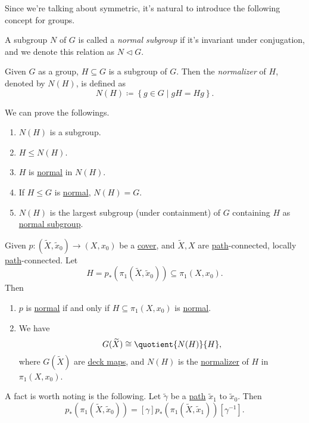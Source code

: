 Since we're talking about symmetric, it's natural to introduce the following concept for groups.
\begin{definition}\label{def:normal-subgroup}
	A subgroup \(N\) of \(G\) is called a \emph{normal subgroup} if it's invariant under conjugation, and we denote this relation as \(N \triangleleft G\).
\end{definition}

\begin{definition}[Normalizer]\label{def:normalizer}
	Given \(G\) as a group, \(H\subseteq G\) is a subgroup of \(G\). Then the \emph{normalizer} of \(H\), denoted by \(N(H)\), is defined as
	\[
		N(H) \coloneqq \left\{g\in G \mid gH = H g\right\}.
	\]
\end{definition}

\begin{exercise}
	We can prove the followings.
	\begin{enumerate}
		\item \(N(H)\) is a subgroup.
		\item \(H\leq N(H)\).
		\item \(H\) is \hyperref[def:normal-subgroup]{normal} in \(N(H)\).
		\item If \(H\leq G\) is \hyperref[def:normal-subgroup]{normal}, \(N(H) = G\).
		\item \(N(H)\) is the largest subgroup (under containment) of \(G\) containing \(H\) as \hyperref[def:normal-subgroup]{normal subgroup}.
	\end{enumerate}
\end{exercise}

\begin{proposition}\label{prop:lec17}
	Given \(p\colon (\widetilde{X} , \widetilde{x} _0)\to (X, x_0)\) be a \hyperref[def:covering-map]{cover}, and \(\widetilde{X} , X\)
	are \hyperref[def:path]{path}-connected, locally \hyperref[def:path]{path}-connected. Let
	\[
		H = p_\ast (\pi _1(\widetilde{X} , \widetilde{x} _0))\subseteq \pi _1(X, x_0).
	\]
	Then
	\begin{enumerate}
		\item \(p\) is \hyperref[def:normal-cover]{normal} if and only if \(H\subseteq \pi _1(X, x_0)\) is \hyperref[def:normal-subgroup]{normal}.
		\item We have
		      \[
			      G(\widetilde{X} )\cong \quotient{N(H)}{H},
		      \]
		      where \(G(\widetilde{X} )\) are \hyperref[def:deck-transformation]{deck maps}, and \(N(H)\) is the \hyperref[def:normalizer]{normalizer}
		      of \(H\) in \(\pi _1(X, x_0)\).
	\end{enumerate}
\end{proposition}

\begin{remark}
	A fact is worth noting is the following. Let \(\widetilde{\gamma} \) be a \hyperref[def:path]{path} \(\widetilde{x} _1\) to \(\widetilde{x} _0\).
	Then
	\[
		p_\ast (\pi _1(\widetilde{X} , \widetilde{x} _0))= [\gamma ] p_\ast (\pi _1(\widetilde{X} , \widetilde{x} _1)) [\gamma ^{-1}].
	\]
	\begin{figure}[H]
		\centering
		\label{fig:rmk:lec17:1}
	\end{figure}
\end{remark}
